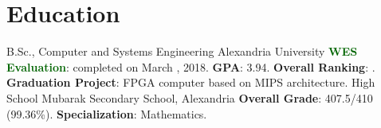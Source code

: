 \documentclass[letterpaper]{twentysecondcv} %
\begin{document}





\makeprofile


\section{Education}

\begin{twenty} %
               {B.Sc., Computer and Systems Engineering}
               {Alexandria University}
               {\textcolor{darkgreen}{\textbf{WES Evaluation}}: completed on March , 2018.\newline
                \textbf{GPA}: 3.94.\newline
                \textbf{Overall Ranking}: \underline{}.\newline
                \textbf{Graduation Project}: FPGA computer based on MIPS architecture.\newline
               }
               {High School}
               {Mubarak Secondary School, Alexandria}
               {\textbf{Overall Grade}: 407.5/410 (99.36\%).\newline
                \textbf{Specialization}: Mathematics.}
\end{twenty}
\end{document}
